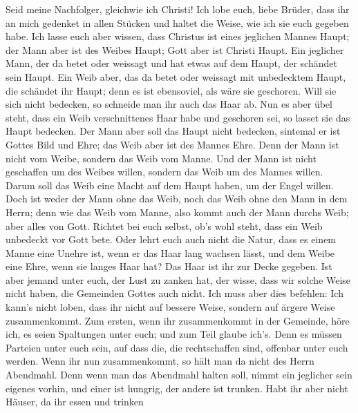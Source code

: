  Seid meine Nachfolger, gleichwie ich Christi!
 Ich lobe euch, liebe Brüder, dass ihr an mich gedenket in
allen Stücken und haltet die Weise, wie ich sie euch gegeben habe.
 Ich lasse euch aber wissen, dass Christus ist eines
jeglichen Mannes Haupt; der Mann aber ist des Weibes Haupt; Gott aber
ist Christi Haupt.  Ein jeglicher Mann, der da betet oder
weissagt und hat etwas auf dem Haupt, der schändet sein Haupt.
 Ein Weib aber, das da betet oder weissagt mit unbedecktem
Haupt, die schändet ihr Haupt; denn es ist ebensoviel, als wäre sie
geschoren.  Will sie sich nicht bedecken, so schneide man
ihr auch das Haar ab. Nun es aber übel steht, dass ein Weib
verschnittenes Haar habe und geschoren sei, so lasset sie das Haupt
bedecken.  Der Mann aber soll das Haupt nicht bedecken,
sintemal er ist Gottes Bild und Ehre; das Weib aber ist des Mannes Ehre.
 Denn der Mann ist nicht vom Weibe, sondern das Weib vom
Manne.  Und der Mann ist nicht geschaffen um des Weibes
willen, sondern das Weib um des Mannes willen.  Darum
soll das Weib eine Macht auf dem Haupt haben, um der Engel willen.
 Doch ist weder der Mann ohne das Weib, noch das Weib
ohne den Mann in dem Herrn;  denn wie das Weib vom Manne,
also kommt auch der Mann durchs Weib; aber alles von Gott.
 Richtet bei euch selbst, ob's wohl steht, dass ein Weib
unbedeckt vor Gott bete.  Oder lehrt euch auch nicht die
Natur, dass es einem Manne eine Unehre ist, wenn er das Haar lang
wachsen lässt,  und dem Weibe eine Ehre, wenn sie langes
Haar hat? Das Haar ist ihr zur Decke gegeben.  Ist aber
jemand unter euch, der Lust zu zanken hat, der wisse, dass wir solche
Weise nicht haben, die Gemeinden Gottes auch nicht.  Ich
muss aber dies befehlen: Ich kann's nicht loben, dass ihr nicht auf
bessere Weise, sondern auf ärgere Weise zusammenkommt. 
Zum ersten, wenn ihr zusammenkommt in der Gemeinde, höre ich, es seien
Spaltungen unter euch; und zum Teil glaube ich's.  Denn
es müssen Parteien unter euch sein, auf dass die, die rechtschaffen
sind, offenbar unter euch werden.  Wenn ihr nun
zusammenkommt, so hält man da nicht des Herrn Abendmahl. 
Denn wenn man das Abendmahl halten soll, nimmt ein jeglicher sein
eigenes vorhin, und einer ist hungrig, der andere ist trunken.
 Habt ihr aber nicht Häuser, da ihr essen und trinken
